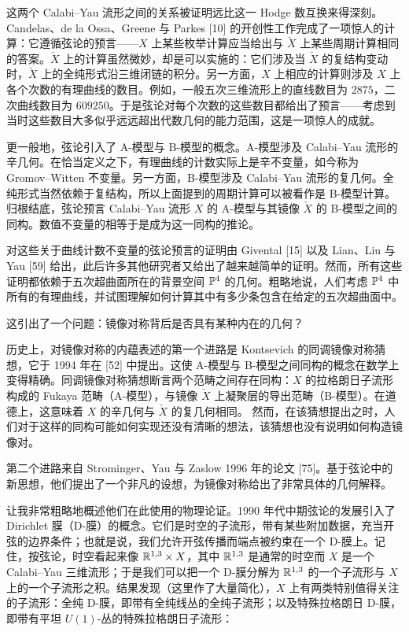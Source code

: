 这两个 Calabi--Yau 流形之间的关系被证明远比这一 Hodge 数互换来得深刻。Candelas、de la Ossa、Greene 与 Parkes [10] 的开创性工作完成了一项惊人的计算：它遵循弦论的预言------$X$ 上某些枚举计算应当给出与 $\check X$ 上某些周期计算相同的答案。$\check X$ 上的计算虽然微妙，却是可以实施的：它们涉及当 $\check X$ 的复结构变动时，$\check X$ 上的全纯形式沿三维闭链的积分。另一方面，$X$ 上相应的计算则涉及 $X$ 上各个次数的有理曲线的数目。例如，一般五次三维流形上的直线数目为 $2875$，二次曲线数目为 $609250$。于是弦论对每个次数的这些数目都给出了预言------考虑到当时这些数目大多似乎远远超出代数几何的能力范围，这是一项惊人的成就。

更一般地，弦论引入了 A-模型与 B-模型的概念。A-模型涉及 Calabi--Yau 流形的辛几何。在恰当定义之下，有理曲线的计数实际上是辛不变量，如今称为 Gromov--Witten 不变量。另一方面，B-模型涉及 Calabi--Yau 流形的复几何。全纯形式当然依赖于复结构，所以上面提到的周期计算可以被看作是 B-模型计算。归根结底，弦论预言 Calabi--Yau 流形 $X$ 的 A-模型与其镜像 $\check X$ 的 B-模型之间的同构。数值不变量的相等于是成为这一同构的推论。

对这些关于曲线计数不变量的弦论预言的证明由 Givental [15] 以及 Lian、Liu 与 Yau [59] 给出，此后许多其他研究者又给出了越来越简单的证明。然而，所有这些证明都依赖于五次超曲面所在的背景空间 $\mathbb{P}^4$ 的几何。粗略地说，人们考虑 $\mathbb{P}^4$ 中所有的有理曲线，并试图理解如何计算其中有多少条包含在给定的五次超曲面中。

这引出了一个问题：镜像对称背后是否具有某种内在的几何？

历史上，对镜像对称的内蕴表述的第一个进路是 Kontsevich 的同调镜像对称猜想，它于 1994 年在 [52] 中提出。这使 A-模型与 B-模型之间同构的概念在数学上变得精确。同调镜像对称猜想断言两个范畴之间存在同构：$X$ 的拉格朗日子流形构成的 Fukaya 范畴（A-模型），与镜像 $\check X$ 上凝聚层的导出范畴（B-模型）。在道德上，这意味着 $X$ 的辛几何与 $\check X$ 的复几何相同。
然而，在该猜想提出之时，人们对于这样的同构可能如何实现还没有清晰的想法，该猜想也没有说明如何构造镜像对。

第二个进路来自 Strominger、Yau 与 Zaslow 1996 年的论文 [75]。基于弦论中的新思想，他们提出了一个非凡的设想，为镜像对称给出了非常具体的几何解释。

让我非常粗略地概述他们在此使用的物理论证。1990 年代中期弦论的发展引入了 Dirichlet 膜（D-膜）的概念。它们是时空的子流形，带有某些附加数据，充当开弦的边界条件；也就是说，我们允许开弦传播而端点被约束在一个 D-膜上。记住，按弦论，时空看起来像 $\mathbb{R}^{1,3}\times X$，其中 $\mathbb{R}^{1,3}$ 是通常的时空而 $X$ 是一个 Calabi--Yau 三维流形；于是我们可以把一个 D-膜分解为 $\mathbb{R}^{1,3}$ 的一个子流形与 $X$ 上的一个子流形之积。结果发现（这里作了大量简化），$X$ 上有两类特别值得关注的子流形：全纯 D-膜，即带有全纯线丛的全纯子流形；以及特殊拉格朗日 D-膜，即带有平坦 $U(1)$-丛的特殊拉格朗日子流形：

